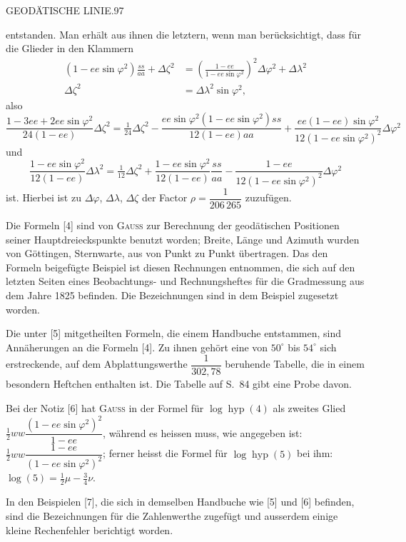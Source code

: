 \clearpage
\noindent\mbox{}\hfill GEODÄTISCHE LINIE.\hfill 97\par
{\small
\noindent entstanden. Man erhält aus ihnen die letztern, wenn man berücksichtigt, dass für die Glieder in den Klammern
\[
\begin{aligned}
(1-ee\sin\varphi^2)\frac{ss}{aa}+\Delta\zeta^2&=\left(\frac{1-ee}{1-ee\sin\varphi^2}\right)^2\Delta\varphi^2+\Delta\lambda^2\\
\Delta\zeta^2&=\Delta\lambda^2\sin\varphi^2,
\end{aligned}
\]
also
\[
\frac{1-3ee+2ee\sin\varphi^2}{24(1-ee)}\Delta\zeta^2=\tfrac1{24}\Delta\zeta^2-\frac{ee\sin\varphi^2(1-ee\sin\varphi^2)ss}{12(1-ee)aa}+\frac{ee(1-ee)\sin\varphi^2}{12(1-ee\sin\varphi^2)^2}\Delta\varphi^2
\]
und
\[
\frac{1-ee\sin\varphi^2}{12(1-ee)}\Delta\lambda^2=\tfrac1{12}\Delta\zeta^2+\frac{1-ee\sin\varphi^2}{12(1-ee)}\frac{ss}{aa}-\frac{1-ee}{12(1-ee\sin\varphi^2)^2}\Delta\varphi^2
\]
ist. Hierbei ist zu $\Delta\varphi$, $\Delta\lambda$, $\Delta\zeta$ der Factor $\rho=\dfrac1{206\,265}$ zuzufügen.

Die Formeln [4] sind von \textsc{Gauss} zur Berechnung der geodätischen Positionen seiner Hauptdreieckspunkte benutzt worden; Breite, Länge und Azimuth wurden von Göttingen, Sternwarte, aus von Punkt zu Punkt übertragen. Das den Formeln beigefügte Beispiel ist diesen Rechnungen entnommen, die sich auf den letzten Seiten eines Beobachtungs- und Rechnungsheftes für die Gradmessung aus dem Jahre 1825 befinden. Die Bezeichnungen sind in dem Beispiel zugesetzt worden.

Die unter [5] mitgetheilten Formeln, die einem Handbuche entstammen, sind Annäherungen an die Formeln [4]. Zu ihnen gehört eine von $50^\circ$ bis $54^\circ$ sich erstreckende, auf dem Abplattungswerthe $\dfrac1{302{,}78}$ beruhende Tabelle, die in einem besondern Heftchen enthalten ist. Die Tabelle auf S.\ 84 gibt eine Probe davon.

Bei der Notiz [6] hat \textsc{Gauss} in der Formel für $\log\operatorname{hyp}(4)$ als zweites Glied $\tfrac12ww\dfrac{(1-ee\sin\varphi^2)^2}{1-ee}$, während es heissen muss, wie angegeben ist: $\tfrac12ww\dfrac{1-ee}{(1-ee\sin\varphi^2)^2}$; ferner heisst die Formel für $\log\operatorname{hyp}(5)$ bei ihm: $\log(5)=\tfrac12\mu-\tfrac34\nu$.

In den Beispielen [7], die sich in demselben Handbuche wie [5] und [6] befinden, sind die Bezeichnungen für die Zahlenwerthe zugefügt und ausserdem einige kleine Rechenfehler berichtigt worden.

}
